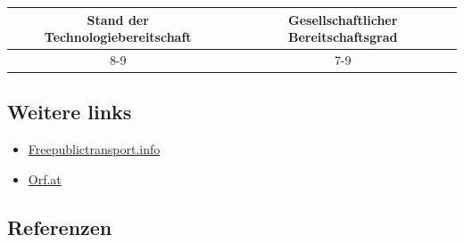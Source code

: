 \documentclass[
]{book}
\providecommand{\tightlist}{%
  \setlength{\itemsep}{0pt}\setlength{\parskip}{0pt}}
\begin{document}
\begin{longtable}[]{@{}cc@{}}
\toprule
Stand der Technologiebereitschaft & Gesellschaftlicher Bereitschaftsgrad\tabularnewline
\midrule
\endhead
8-9 & 7-9\tabularnewline
\bottomrule
\end{longtable}

\hypertarget{weitere-links-19}{%
\subsection*{Weitere links}\label{weitere-links-19}}

\begin{itemize}
\tightlist
\item
  \href{https://freepublictransport.info/city/}{Freepublictransport.info}
\item
  \href{https://orf.at/stories/3113027/}{Orf.at}
\end{itemize}

\hypertarget{referenzen-23}{%
\subsection*{Referenzen}\label{referenzen-23}}
\end{document}
